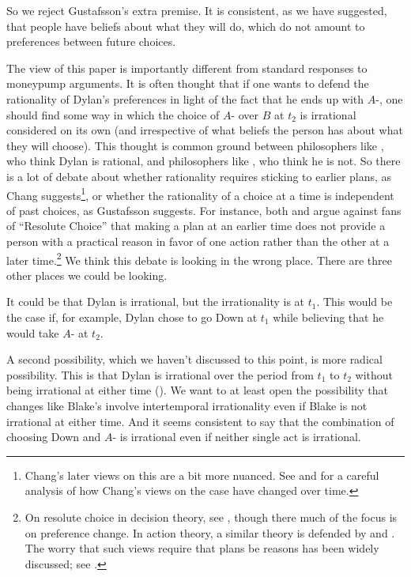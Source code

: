 \documentclass[
  11pt,
  letterpaper]{article}
\begin{document}
So we reject Gustafsson's extra premise. It is consistent, as we have suggested, that people have beliefs about what they will do, which do not amount to preferences between future choices.

The view of this paper is importantly different from standard responses to moneypump arguments. It is often thought that if one wants to defend the rationality of Dylan's preferences in light of the fact that he ends up with $A$-, one should find some way in which the choice of $A$- over $B$ at $t_2$ is irrational considered on its own (and irrespective of what beliefs the person has about what they will choose). This thought is common ground between philosophers like \citet{Chang2005}, who think Dylan is rational, and philosophers like \citet{Gustafsson2022}, who think he is not. So there is a lot of debate about whether rationality requires sticking to earlier plans, as Chang suggests\footnote{Chang's later views on this are a bit more nuanced. See \citet{Chang2017} and \citet[sect. 4]{Doody2019} for a careful analysis of how Chang's views on the case have changed over time.}, or whether the rationality of a choice at a time is independent of past choices, as Gustafsson suggests. For instance, both \citet[p. 8-9]{Elga2010} and \citet[p. 66-74]{Gustafsson2022} argue against fans of ``Resolute Choice'' that making a plan at an earlier time does not provide a person with a practical reason in favor of one action rather than the other at a later time.\footnote{On resolute choice in decision theory, see \citet{McClennen1990}, though there much of the focus is on preference change. In action theory, a similar theory is defended by \citet{Bratman1987} and \citet{Holton2009}. The worry that such views require that plans be reasons has been widely discussed; see \citet[Sect. 4]{sep-intention}.} We think this debate is looking in the wrong place. There are three other places we could be looking.

It could be that Dylan is irrational, but the irrationality is at $t_1$. This would be the case if, for example, Dylan chose to go Down at $t_1$ while believing that he would take $A$- at $t_2$.

A second possibility, which we haven't discussed to this point, is more radical possibility. This is that Dylan is irrational over the period from $t_1$ to $t_2$ without being irrational at either time (\citet[p. 12]{weatherson2008decision}). We want to at least open the possibility that changes like Blake's involve intertemporal irrationality even if Blake is not irrational at either time. And it seems consistent to say that the combination of choosing Down and $A$- is irrational even if neither single act is irrational.
\end{document}
